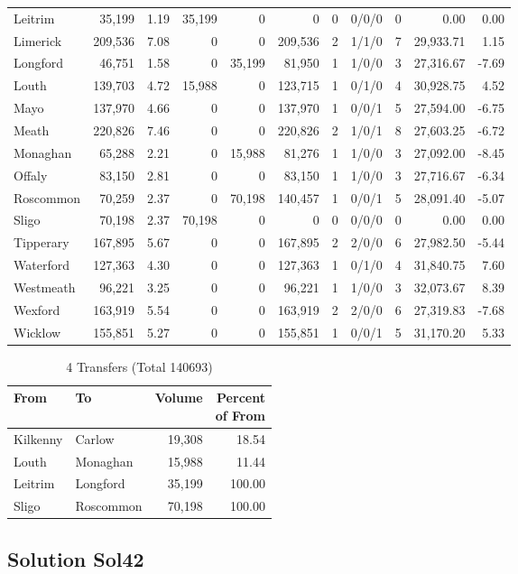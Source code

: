 \documentclass[a4paper]{article}
\begin{document}
\begin{longtable}{lrrrrrrlrrr}
Leitrim&35,199& 1.19&35,199&0&0&0&0/0/0&0& 0.00& 0.00\\ 
Limerick&209,536& 7.08&0&0&209,536&2&1/1/0&7&29,933.71& 1.15\\ 
Longford&46,751& 1.58&0&35,199&81,950&1&1/0/0&3&27,316.67&-7.69\\ 
Louth&139,703& 4.72&15,988&0&123,715&1&0/1/0&4&30,928.75& 4.52\\ 
Mayo&137,970& 4.66&0&0&137,970&1&0/0/1&5&27,594.00&-6.75\\ 
Meath&220,826& 7.46&0&0&220,826&2&1/0/1&8&27,603.25&-6.72\\ 
Monaghan&65,288& 2.21&0&15,988&81,276&1&1/0/0&3&27,092.00&-8.45\\ 
Offaly&83,150& 2.81&0&0&83,150&1&1/0/0&3&27,716.67&-6.34\\ 
Roscommon&70,259& 2.37&0&70,198&140,457&1&0/0/1&5&28,091.40&-5.07\\ 
Sligo&70,198& 2.37&70,198&0&0&0&0/0/0&0& 0.00& 0.00\\ 
Tipperary&167,895& 5.67&0&0&167,895&2&2/0/0&6&27,982.50&-5.44\\ 
Waterford&127,363& 4.30&0&0&127,363&1&0/1/0&4&31,840.75& 7.60\\ 
Westmeath&96,221& 3.25&0&0&96,221&1&1/0/0&3&32,073.67& 8.39\\ 
Wexford&163,919& 5.54&0&0&163,919&2&2/0/0&6&27,319.83&-7.68\\ 
Wicklow&155,851& 5.27&0&0&155,851&1&0/0/1&5&31,170.20& 5.33\\ 
\end{longtable}

\begin{table}[htbp]
\caption{4 Transfers (Total 140693)}
\centering
\begin{tabular}{llrr} \toprule
From &To &Volume &\shortstack{Percent\\of From} \\ \midrule
Kilkenny&Carlow&19,308&18.54\\ 
Louth&Monaghan&15,988&11.44\\ 
Leitrim&Longford&35,199&100.00\\ 
Sligo&Roscommon&70,198&100.00\\ 
\bottomrule
\end{tabular}
\end{table}

\clearpage
\subsection{Solution Sol42}
\end{document}
